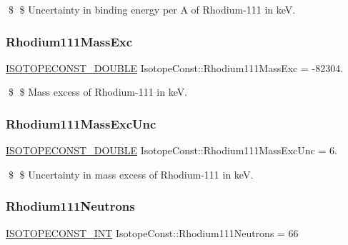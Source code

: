 \$ \$ Uncertainty in binding energy per A of Rhodium-\/111 in keV. \mbox{\label{group___isotope_const-_rhodium-_rh111_ga58e11ce2c018e5a97c6d218757f02de2}} 
\subsubsection{\texorpdfstring{Rhodium111\+Mass\+Exc}{Rhodium111MassExc}}
{\footnotesize\ttfamily \mbox{\hyperlink{group___isotope_const-_macros_ga8f45a7272ce02c0b4c65c44636ed719a}{I\+S\+O\+T\+O\+P\+E\+C\+O\+N\+S\+T\+\_\+\+D\+O\+U\+B\+LE}} Isotope\+Const\+::\+Rhodium111\+Mass\+Exc = -\/82304.}

\$ \$ Mass excess of Rhodium-\/111 in keV. \mbox{\label{group___isotope_const-_rhodium-_rh111_ga14ecb200b0c296e5378fb4da635f3249}} 
\subsubsection{\texorpdfstring{Rhodium111\+Mass\+Exc\+Unc}{Rhodium111MassExcUnc}}
{\footnotesize\ttfamily \mbox{\hyperlink{group___isotope_const-_macros_ga8f45a7272ce02c0b4c65c44636ed719a}{I\+S\+O\+T\+O\+P\+E\+C\+O\+N\+S\+T\+\_\+\+D\+O\+U\+B\+LE}} Isotope\+Const\+::\+Rhodium111\+Mass\+Exc\+Unc = 6.}

\$ \$ Uncertainty in mass excess of Rhodium-\/111 in keV. \mbox{\label{group___isotope_const-_rhodium-_rh111_gacf1d0eba57a08372282d82cdc033c604}} 
\subsubsection{\texorpdfstring{Rhodium111\+Neutrons}{Rhodium111Neutrons}}
{\footnotesize\ttfamily \mbox{\hyperlink{group___isotope_const-_macros_ga5f18360b3e99483a35c32d789e62621c}{I\+S\+O\+T\+O\+P\+E\+C\+O\+N\+S\+T\+\_\+\+I\+NT}} Isotope\+Const\+::\+Rhodium111\+Neutrons = 66}

